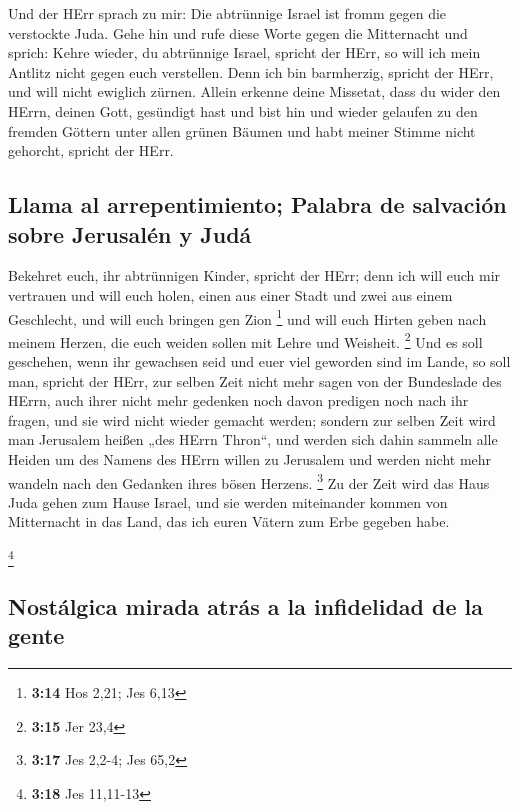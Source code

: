  Und der HErr sprach zu mir: Die abtrünnige Israel ist
fromm gegen die verstockte Juda.  Gehe hin und rufe diese
Worte gegen die Mitternacht und sprich: Kehre wieder, du abtrünnige
Israel, spricht der HErr, so will ich mein Antlitz nicht gegen euch
verstellen. Denn ich bin barmherzig, spricht der HErr, und will nicht
ewiglich zürnen.  Allein erkenne deine Missetat, dass du
wider den HErrn, deinen Gott, gesündigt hast und bist hin und wieder
gelaufen zu den fremden Göttern unter allen grünen Bäumen und habt
meiner Stimme nicht gehorcht, spricht der HErr.

\hypertarget{llama-al-arrepentimiento-palabra-de-salvaciuxf3n-sobre-jerusaluxe9n-y-juduxe1}{%
\subsection{Llama al arrepentimiento; Palabra de salvación sobre
Jerusalén y
Judá}\label{llama-al-arrepentimiento-palabra-de-salvaciuxf3n-sobre-jerusaluxe9n-y-juduxe1}}

 Bekehret euch, ihr abtrünnigen Kinder, spricht der HErr;
denn ich will euch mir vertrauen und will euch holen, einen aus einer
Stadt und zwei aus einem Geschlecht, und will euch bringen gen Zion
\footnote{\textbf{3:14} Hos 2,21; Jes 6,13}  und will
euch Hirten geben nach meinem Herzen, die euch weiden sollen mit Lehre
und Weisheit. \footnote{\textbf{3:15} Jer 23,4}  Und es
soll geschehen, wenn ihr gewachsen seid und euer viel geworden sind im
Lande, so soll man, spricht der HErr, zur selben Zeit nicht mehr sagen
von der Bundeslade des HErrn, auch ihrer nicht mehr gedenken noch davon
predigen noch nach ihr fragen, und sie wird nicht wieder gemacht werden;
 sondern zur selben Zeit wird man Jerusalem heißen „des
HErrn Thron``, und werden sich dahin sammeln alle Heiden um des Namens
des HErrn willen zu Jerusalem und werden nicht mehr wandeln nach den
Gedanken ihres bösen Herzens. \footnote{\textbf{3:17} Jes 2,2-4; Jes
  65,2}  Zu der Zeit wird das Haus Juda gehen zum Hause
Israel, und sie werden miteinander kommen von Mitternacht in das Land,
das ich euren Vätern zum Erbe gegeben habe.

\footnote{\textbf{3:18} Jes 11,11-13}

\hypertarget{nostuxe1lgica-mirada-atruxe1s-a-la-infidelidad-de-la-gente}{%
\subsection{Nostálgica mirada atrás a la infidelidad de la
gente}\label{nostuxe1lgica-mirada-atruxe1s-a-la-infidelidad-de-la-gente}}

